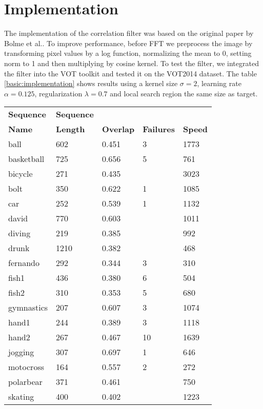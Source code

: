 \documentclass[9pt]{IEEEtran}
\begin{document}
\section{Implementation}
The implementation of the correlation filter was based on the original paper by Bolme et al.\cite{bolme2010mosse}.
To improve performance, before FFT we preprocess the image by transforming pixel values by a log function, normalizing the mean to 0, setting norm to 1 and then multiplying by cosine kernel.
To test the filter, we integrated the filter into the VOT toolkit and tested it on the VOT2014 dataset.
The table \ref*{basic:implementation} shows results using a kernel size $\sigma = 2$, learning rate $\alpha = 0.125$, regularization $\lambda = 0.7$ and local search region the same size as target.
\begin{table}[!ht]
    \centering
    \begin{tabular}{lllll}
        \textbf{Sequence} & \textbf{Sequence} \\
        \textbf{Name} & \textbf{Length} & \textbf{Overlap} & \textbf{Failures} & \textbf{Speed} \\ \hline
        ball & 602 & 0.451 & 3 & 1773 \\ 
        basketball & 725 & 0.656 & 5 & 761 \\ 
        bicycle & 271 & 0.435 & ~ & 3023 \\ 
        bolt & 350 & 0.622 & 1 & 1085 \\ 
        car & 252 & 0.539 & 1 & 1132 \\ 
        david & 770 & 0.603 & ~ & 1011 \\ 
        diving & 219 & 0.385 & ~ & 992 \\ 
        drunk & 1210 & 0.382 & ~ & 468 \\ 
        fernando & 292 & 0.344 & 3 & 310 \\ 
        fish1 & 436 & 0.380 & 6 & 504 \\ 
        fish2 & 310 & 0.353 & 5 & 680 \\ 
        gymnastics & 207 & 0.607 & 3 & 1074 \\ 
        hand1 & 244 & 0.389 & 3 & 1118 \\ 
        hand2 & 267 & 0.467 & 10 & 1639 \\ 
        jogging & 307 & 0.697 & 1 & 646 \\ 
        motocross & 164 & 0.557 & 2 & 272 \\ 
        polarbear & 371 & 0.461 & ~ & 750 \\ 
        skating & 400 & 0.402 & ~ & 1223 \\ 

\end{tabular}
\end{table}
\end{document}
